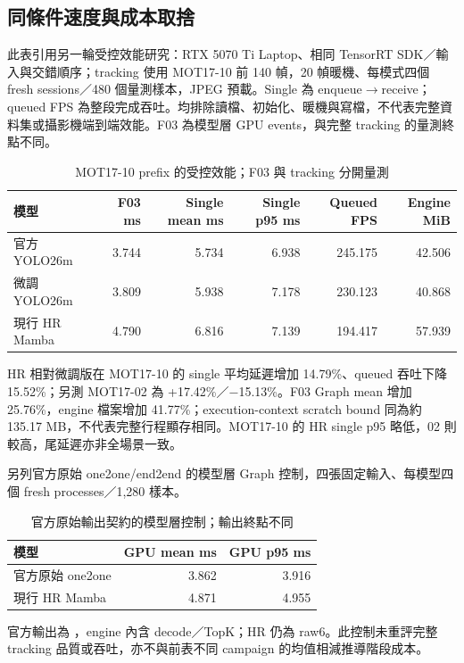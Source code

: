 \subsection{同條件速度與成本取捨}
此表引用另一輪受控效能研究：RTX 5070 Ti Laptop、相同 TensorRT SDK／輸入與交錯順序；tracking 使用 MOT17-10 前 140 幀，20 幀暖機、每模式四個 fresh sessions／480 個量測樣本，JPEG 預載。Single 為 enqueue\ensuremath{\to}receive；queued FPS 為整段完成吞吐。均排除讀檔、初始化、暖機與寫檔，不代表完整資料集或攝影機端到端效能。F03 為模型層 GPU events，與完整 tracking 的量測終點不同。

\begin{table}[H]
\caption{MOT17-10 prefix 的受控效能；F03 與 tracking 分開量測}
\small
\noindent\begin{tabularx}{\textwidth}{@{}Yrrrrr@{}}
\toprule
模型 & F03 ms & Single mean ms & Single p95 ms & Queued FPS & Engine MiB \\
\midrule
官方 YOLO26m & 3.744 & 5.734 & 6.938 & 245.175 & 42.506 \\
微調 YOLO26m & 3.809 & 5.938 & 7.178 & 230.123 & 40.868 \\
現行 HR Mamba & 4.790 & 6.816 & 7.139 & 194.417 & 57.939 \\
\bottomrule
\end{tabularx}
\end{table}
HR 相對微調版在 MOT17-10 的 single 平均延遲增加 14.79\%、queued 吞吐下降 15.52\%；另測 MOT17-02 為 +17.42\%／−15.13\%。F03 Graph mean 增加 25.76\%，engine 檔案增加 41.77\%；execution-context scratch bound 同為約 135.17 MB，不代表完整行程顯存相同。MOT17-10 的 HR single p95 略低，02 則較高，尾延遲亦非全場景一致。

另列官方原始 one2one/end2end 的模型層 Graph 控制，四張固定輸入、每模型四個 fresh processes／1,280 樣本。
\begin{table}[H]
\caption{官方原始輸出契約的模型層控制；輸出終點不同}
\small
\noindent\begin{tabularx}{\textwidth}{@{}Yrr@{}}
\toprule
模型 & GPU mean ms & GPU p95 ms \\
\midrule
官方原始 one2one & 3.862 & 3.916 \\
現行 HR Mamba & 4.871 & 4.955 \\
\bottomrule
\end{tabularx}
\end{table}
官方輸出為 \code{[1,300,6]}，engine 內含 decode／TopK；HR 仍為 raw6。此控制未重評完整 tracking 品質或吞吐，亦不與前表不同 campaign 的均值相減推導階段成本。
